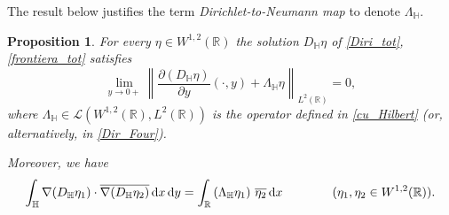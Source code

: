 \documentclass{amsart} %
\numberwithin{equation}{section}
\newtheorem{proposition}[theorem]{Proposition}
\theoremstyle{definition}
\begin{document}
The result below justifies  the term {\em Dirichlet-to-Neumann map} to denote $\Lambda_\mathbb{H}$.

\begin{proposition}\label{there_exists}
For every $\eta\in W^{1,2}(\mathbb{R})$ the solution $D_\mathbb{H}\eta$ of  \eqref{Diri_tot}, \eqref{frontiera_tot}
satisfies
\begin{equation}\label{urma_bizara}
\lim_{y\to 0+} \left\|\frac{\partial(D_\mathbb{H}\eta)}{\partial y}(\cdot,y)+\Lambda_\mathbb{H} \eta\right\|_{L^2(\mathbb{R})}=0,
\end{equation}
where  $\Lambda_\mathbb{H}\in \mathcal{L}(W^{1,2}(\mathbb{R}),L^2(\mathbb{R}))$ is the operator defined in 
\eqref{cu_Hilbert} (or, alternatively, in \eqref{Dir_Four}).

Moreover, we have
\begin{equation}\label{cu_H_mare}
\int_\mathbb{H} \nabla(D_\mathbb{H} \eta_1)\cdot \overline{\nabla (D_\mathbb{H} \eta_2)} \, {\rm d}x\, {\rm d}y=\int_\mathbb{R} \left(\Lambda_\mathbb{H}\eta_1\right)\, \overline{\eta_2} \, {\rm d}x
\qquad\qquad(\eta_1, \eta_2\in W^{1,2}(\mathbb{R})).
\end{equation}

\end{proposition}
\end{document}
